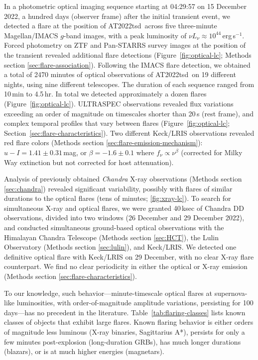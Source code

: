 \documentclass{nature_plusfigure}
\newcommand{\at}{AT2022tsd}
\begin{document}
In a photometric optical imaging sequence starting at 04:29:57 on 15 December 2022, a hundred days (observer frame) after the initial transient event, we detected\cite{Ho2022_Astronote_Flares} a flare at the position of \at\ across five three-minute Magellan/IMACS $g$-band images, with a peak luminosity of $\nu L_\nu \approx 10^{44}\,$erg\,s$^{-1}$.
Forced photometry on ZTF and Pan-STARRS survey images at the position of the transient revealed additional flare detections (Figure~\ref{fig:optical-lc}; Methods section \ref{sec:flare-association}).
Following the IMACS flare detection, we obtained a total of 2470 minutes of optical observations of \at\ on 19 different nights, using nine different telescopes. The duration of each sequence ranged from 10\,min to 4.5\,hr. In total we detected approximately a dozen flares (Figure~\ref{fig:optical-lc}). ULTRASPEC observations revealed flux variations exceeding an order of magnitude on timescales shorter than 20\,s (rest frame), and complex temporal profiles that vary between flares (Figure~\ref{fig:optical-lc}; Section~\ref{sec:flare-characteristics}).
Two different Keck/LRIS observations revealed red flare colors (Methods section \ref{sec:flare-emission-mechanism}):
$u-I=1.41\pm0.31\,$mag, or $\beta=-1.6\pm0.1$ where
$f_\nu \propto \nu^{\beta}$ (corrected for Milky Way extinction but not corrected for host attenuation).

Analysis of previously obtained \emph{Chandra} X-ray observations (Methods section \ref{sec:chandra}) revealed significant variability, possibly with flares of similar durations to the optical flares (tens of minutes; \ref{fig:xray-lc}). To search for simultaneous X-ray and optical flares,
we were granted 40\,ksec of Chandra DD observations, divided into two windows (26 December and 29 December 2022),
and conducted simultaneous ground-based optical observations with the Himalayan Chandra Telescope (Methods section \ref{sec:HCT}), the Lulin Observatory (Methods section \ref{sec:lulin}), and Keck/LRIS. We detected one definitive optical flare with Keck/LRIS on 29 December, with no clear X-ray flare counterpart.
We find no clear periodicity in either the optical or X-ray emission (Methods section \ref{sec:flare-characteristics}).

To our knowledge, such behavior---minute-timescale optical flares at supernova-like luminosities, with order-of-magnitude amplitude variations, persisting for 100 days---has no precedent in the literature. Table~\ref{tab:flaring-classes} lists known classes of objects that exhibit large flares. Known flaring behavior is either orders of magnitude less luminous (X-ray binaries\cite{Fender1997}, Sagittarius A*\cite{Marrone2008}), persists for only a few minutes post-explosion (long-duration GRBs\cite{Racusin2008}), has much longer durations (blazars\cite{Nesci2021}), or is at much higher energies (magnetars\cite{Hurley1999}).
\end{document}
